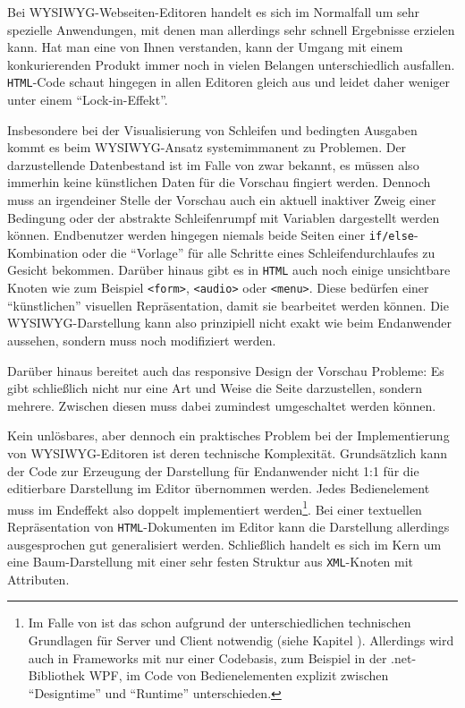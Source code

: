 Bei WYSIWYG-Webseiten-Editoren handelt es sich im Normalfall um sehr spezielle Anwendungen, mit denen man allerdings sehr schnell Ergebnisse erzielen kann. Hat man eine von Ihnen verstanden, kann der Umgang mit einem konkurierenden Produkt immer noch in vielen Belangen unterschiedlich ausfallen. \texttt{HTML}-Code schaut hingegen in allen Editoren gleich aus und leidet daher weniger unter einem "`Lock-in-Effekt"'.

Insbesondere bei der Visualisierung von Schleifen und bedingten Ausgaben kommt es beim WYSIWYG-Ansatz systemimmanent zu Problemen. Der darzustellende Datenbestand ist im Falle von \idename{} zwar bekannt, es müssen also immerhin keine künstlichen Daten für die Vorschau fingiert werden. Dennoch muss an irgendeiner Stelle der Vorschau auch ein aktuell inaktiver Zweig einer Bedingung oder der abstrakte Schleifenrumpf mit Variablen dargestellt werden können. Endbenutzer werden hingegen niemals beide Seiten einer \texttt{if/else}-Kombination oder die "`Vorlage"' für alle Schritte eines Schleifendurchlaufes zu Gesicht bekommen. Darüber hinaus gibt es in \texttt{HTML} auch noch einige unsichtbare Knoten wie zum Beispiel \texttt{<form>}, \texttt{<audio>} oder \texttt{<menu>}. Diese bedürfen einer "`künstlichen"' visuellen Repräsentation, damit sie bearbeitet werden können. Die WYSIWYG-Darstellung kann also prinzipiell nicht exakt wie beim Endanwender aussehen, sondern muss noch modifiziert werden.

Darüber hinaus bereitet auch das responsive Design der Vorschau Probleme: Es gibt schließlich nicht nur eine Art und Weise die Seite darzustellen, sondern mehrere. Zwischen diesen muss dabei zumindest umgeschaltet werden können.

Kein unlösbares, aber dennoch ein praktisches Problem bei der Implementierung von WYSIWYG-Editoren ist deren technische Komplexität. Grundsätzlich kann der Code zur Erzeugung der Darstellung für Endanwender nicht 1:1 für die editierbare Darstellung im Editor übernommen werden. Jedes Bedienelement muss im Endeffekt also doppelt implementiert werden\footnote{Im Falle von \idename{} ist das schon aufgrund der unterschiedlichen technischen Grundlagen für Server und Client notwendig (siehe Kapitel ). Allerdings wird auch in Frameworks mit nur einer Codebasis, zum Beispiel in der .net-Bibliothek WPF, im Code von Bedienelementen explizit zwischen "`Designtime"' und "`Runtime"' unterschieden.}. Bei einer textuellen Repräsentation von \texttt{HTML}-Dokumenten im Editor kann die Darstellung allerdings ausgesprochen gut generalisiert werden. Schließlich handelt es sich im Kern um eine Baum-Darstellung mit einer sehr festen Struktur aus \texttt{XML}-Knoten mit Attributen.

